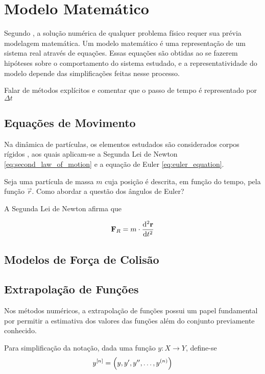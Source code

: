 \chapter{Modelo Matemático}

Segundo , a solução numérica de qualquer problema físico requer sua prévia modelagem matemática. Um modelo matemático é uma representação de um sistema real através de equações. Essas equações são obtidas ao se fazerem hipóteses sobre o comportamento do sistema estudado, e a representatividade do modelo depende das simplificações feitas nesse processo.

\alert{Falar de métodos explícitos e comentar que o passo de tempo é representado por \(\Delta t\)}

\section{Equações de Movimento}

Na dinâmica de partículas, os elementos estudados são considerados corpos rígidos , aos quais aplicam-se a Segunda Lei de Newton \eqref{eq:second_law_of_motion} e a equação de Euler \eqref{eq:euler_equation}.

Seja \particle{} uma partícula de massa \(m\) cuja posição é descrita, em função do tempo, pela função \(\vec{r}\).  \alert{Como abordar a questão dos ângulos de Euler?}

A Segunda Lei de Newton afirma que

\begin{equation} \label{eq:second_law_of_motion}
	\mathbf{F}_R = m\cdot\dv[2]{\mathbf{r}}{t} 
\end{equation}

\section{Modelos de Força de Colisão}

\section{Extrapolação de Funções}

Nos métodos numéricos, a extrapolação de funções possui um papel fundamental por permitir a estimativa dos valores das funções além do conjunto previamente conhecido.

Para simplificação da notação, dada uma função \(y: X\to Y\), define-se
\[\drvec{n}{y} = \pqty{y, y', y'', \dots, y^{\pqty{n}}}\]

